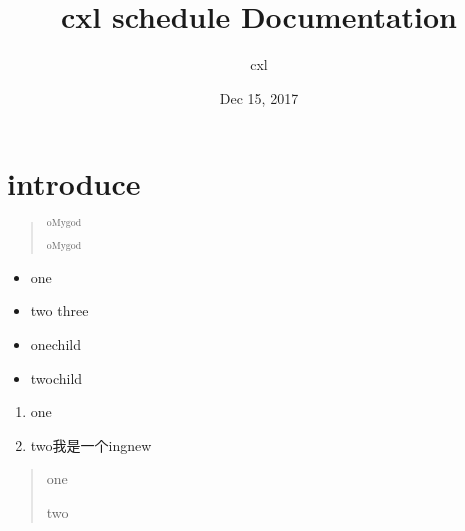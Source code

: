 \documentclass[a4paper,10pt,english]{sphinxmanual}
\title{cxl schedule Documentation}
\date{Dec 15, 2017}
\author{cxl}
\begin{document}
\maketitle
\sphinxtableofcontents
{}\label{\detokenize{index::doc}}



\chapter{introduce}
\label{\detokenize{intro::doc}}\label{\detokenize{intro:introduce}}\label{\detokenize{intro:welcome-to-cxl-schedule-s-documentation}}\begin{quote}



\end{quote}
\label{\detokenize{intro:my-reference-label}}\begin{quote}

$_{\text{oMygod}}$

$^{\text{oMygod}}$

\end{quote}
\begin{itemize}
\item {} 
one

\item {} 
two
three

\end{itemize}
\begin{itemize}
\item {} 
onechild

\item {} 
twochild

\end{itemize}
\begin{enumerate}
\item {} 
one

\item {} 
two我是一个ingnew

\end{enumerate}
\begin{quote}

\begin{DUlineblock}{0em}
\item[] one
\item[] two
\end{DUlineblock}
\end{quote}
\end{document}
